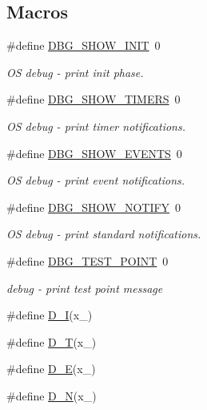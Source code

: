 \subsection*{Macros}
\begin{DoxyCompactItemize}
\item 
\#define \hyperlink{a00040_a3f5985ec802de602e1ec6c5f35cf45ac}{D\+B\+G\+\_\+\+S\+H\+O\+W\+\_\+\+I\+N\+I\+T}~0
\begin{DoxyCompactList}\small\item\em O\+S debug -\/ print init phase. \end{DoxyCompactList}\item 
\#define \hyperlink{a00040_a696094a227f00f646c71694eba56c239}{D\+B\+G\+\_\+\+S\+H\+O\+W\+\_\+\+T\+I\+M\+E\+R\+S}~0
\begin{DoxyCompactList}\small\item\em O\+S debug -\/ print timer notifications. \end{DoxyCompactList}\item 
\#define \hyperlink{a00040_ac99a26a91700184ca9c836b8837fc9c2}{D\+B\+G\+\_\+\+S\+H\+O\+W\+\_\+\+E\+V\+E\+N\+T\+S}~0
\begin{DoxyCompactList}\small\item\em O\+S debug -\/ print event notifications. \end{DoxyCompactList}\item 
\#define \hyperlink{a00040_aeba6fb01c031645d68a352c3e617724f}{D\+B\+G\+\_\+\+S\+H\+O\+W\+\_\+\+N\+O\+T\+I\+F\+Y}~0
\begin{DoxyCompactList}\small\item\em O\+S debug -\/ print standard notifications. \end{DoxyCompactList}\item 
\#define \hyperlink{a00040_ae48f2746c700061f944a2747a966863c}{D\+B\+G\+\_\+\+T\+E\+S\+T\+\_\+\+P\+O\+I\+N\+T}~0
\begin{DoxyCompactList}\small\item\em debug -\/ print test point message \end{DoxyCompactList}\item 
\#define \hyperlink{a00040_a41b841dd3ca98f243a56ff65652be225}{D\+\_\+\+I}(x\+\_\+)
\item 
\#define \hyperlink{a00040_a5e876f6543757da83f9b3ddee08dece7}{D\+\_\+\+T}(x\+\_\+)
\item 
\#define \hyperlink{a00040_ae8251f649f2077b9d0de5a10e6c2cf79}{D\+\_\+\+E}(x\+\_\+)
\item 
\#define \hyperlink{a00040_afdf6a05ce2b9711e8bb4ef40fdb6930a}{D\+\_\+\+N}(x\+\_\+)

\end{DoxyCompactItemize}
